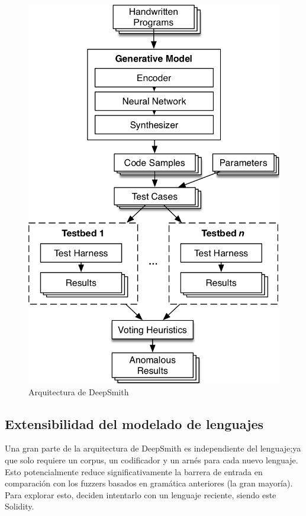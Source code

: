\begin{figure}[h]
    \centering
    \includegraphics[scale=0.5]{images/deepsmith1.png}
    \caption{Arquitectura de DeepSmith}
    \label{fig:deepsmith architecture}
\end{figure}


\subsection{Extensibilidad del modelado de lenguajes}

Una gran parte de la arquitectura de DeepSmith es independiente del lenguaje;ya que solo requiere un corpus, un codificador y un arnés para cada nuevo lenguaje. Esto potencialmente reduce  significativamente la barrera de entrada en comparación con los fuzzers basados en gramática anteriores (la gran mayoría). Para explorar esto, deciden intentarlo con un lenguaje reciente, siendo este Solidity.\\

